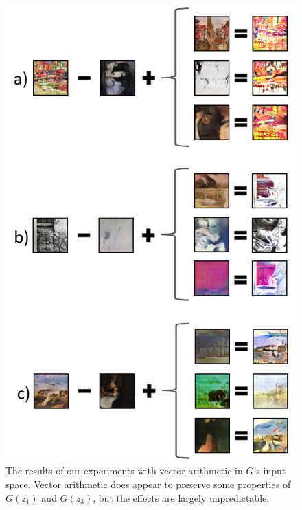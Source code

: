 \documentclass[10pt,twocolumn,letterpaper]{article}
\begin{document}
\begin{figure}[t]
	\begin{center}
		\includegraphics[width=0.8\linewidth]{arith_figure.png}
	\end{center}
	\caption{The results of our experiments with vector arithmetic in $ G $'s input space. Vector arithmetic does appear to preserve some properties of $ G(z_1) $ and $ G(z_3) $, but the effects are largely unpredictable.}
	\label{fig:long}
	\label{fig:onecol}
\end{figure}
\end{document}
